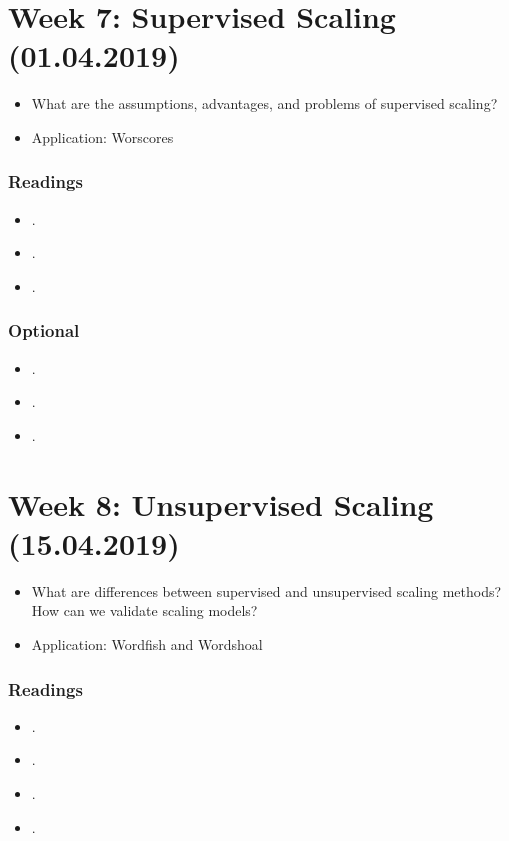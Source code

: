 \documentclass[abstract=on,parskip=full,headings=standardclasses,fontsize=11pt,paper=a4]{scrartcl}
\begin{document}
 
\section{Week 7:  Supervised Scaling (01.04.2019)}

\begin{itemize}
\item What are the assumptions, advantages, and problems of supervised scaling?
\item Application: Worscores
\end{itemize}

\subsubsection*{Readings}
\begin{itemize}
\item {}.
\item {}.
\item {}.
\end{itemize}

\subsubsection*{Optional}
\begin{itemize}
\item {}.
\item {}.
\item {}.
\end{itemize}


\section{Week 8: Unsupervised Scaling (15.04.2019)}

\begin{itemize}
\item What are differences between supervised and unsupervised scaling methods? How can we validate scaling models?
\item Application: Wordfish and Wordshoal
\end{itemize}

\subsubsection*{Readings}
\begin{itemize}
\item {}.
\item {}.
\item {}.
\item {}.
\end{itemize}
\end{document}
